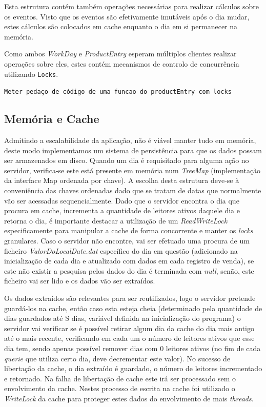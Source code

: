 \documentclass[runningheads]{llncs}
\begin{document}
Esta estrutura contém também operações necessárias para realizar cálculos sobre os eventos. Visto que os eventos são efetivamente imutáveis após o dia mudar, estes cálculos são colocados em cache enquanto o dia em si permanecer na memória.

\noindent Como ambos \emph{WorkDay} e \emph{ProductEntry} esperam múltiplos clientes realizar operações sobre eles, estes contém mecanismos de controlo de concurrência utilizando \texttt{Locks}.

\texttt{Meter pedaço de código de uma funcao do productEntry com locks}


\subsection{Memória e Cache}
Admitindo a escalabilidade da aplicação, não é viável manter tudo em memória, deste modo implementamos um sistema de persistência para que os dados possam ser armazenados em disco. Quando um dia é requisitado para alguma ação no servidor, verifica-se este está presente em memória num \emph{TreeMap} (implementação da interface Map ordenada por chave). A escolha desta estrutura deve-se à conveniência das chaves ordenadas dado que se tratam de datas que normalmente vão ser acessadas sequencialmente.
Dado que o servidor encontra o dia que procura em cache, incrementa a quantidade de leitores ativos daquele dia e retorna o dia, é importante destacar a utilização de um \emph{ReadWriteLock} especificamente para manipular a cache de forma concorrente e manter os \emph{locks} granulares.
Caso o servidor não encontre, vai ser efetuado uma procura de um ficheiro \emph{ValorDoLocalDate.dat} específico do dia em questão (adicionado na inicialização de cada dia e atualizado com dados em cada registro de venda), se este não existir a pesquisa pelos dados do dia é terminada com \emph{null}, senão, este ficheiro vai ser lido e os dados vão ser extraídos.

Os dados extraídos são relevantes para ser reutilizados, logo o servidor pretende guardá-los na cache, então caso esta esteja cheia (determinado pela quantidade de dias guardados até S dias, variável definida na inicialização do programa) o servidor vai verificar se é possível retirar algum dia da cache do dia mais antigo até o mais recente, verificando em cada um o número de leitores ativos que esse dia tem, sendo apenas possível remover dias com 0 leitores ativos (no fim de cada \emph{querie} que utiliza certo dia, deve decrementar este valor). No sucesso de libertação da cache, o dia extraído é guardado, o número de leitores incrementado e retornado. Na falha de libertação de cache este irá ser processado sem o envolvimento da cache. Nestes processo de escrita na cache foi utilizado o \emph{WriteLock} da cache para proteger estes dados do envolvimento de mais \emph{threads}.
\end{document}
